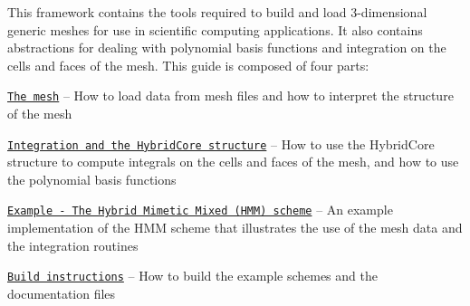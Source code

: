 This framework contains the tools required to build and load 3-\/dimensional generic meshes for use in scientific computing applications. It also contains abstractions for dealing with polynomial basis functions and integration on the cells and faces of the mesh. This guide is composed of four parts\+:


\begin{DoxyItemize}
\item \href{#mesh}{\tt The mesh} -- How to load data from mesh files and how to interpret the structure of the mesh
\item \href{#integration}{\tt Integration and the Hybrid\+Core structure} -- How to use the Hybrid\+Core structure to compute integrals on the cells and faces of the mesh, and how to use the polynomial basis functions
\item \href{#hmm}{\tt Example -\/ The Hybrid Mimetic Mixed (H\+MM) scheme} -- An example implementation of the H\+MM scheme that illustrates the use of the mesh data and the integration routines
\item \href{#build}{\tt Build instructions} -- How to build the example schemes and the documentation files 
\end{DoxyItemize}